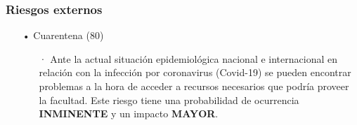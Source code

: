 \subsubsection{Riesgos externos}  
    
    \begin{itemize}
        \item[•] Cuarentena (80)
        \begin{itemize}
            \item[·] Ante la actual situación epidemiológica nacional e internacional en relación con la infección por coronavirus (Covid-19) se pueden encontrar problemas a la hora de acceder a recursos necesarios que podría proveer la facultad. Este riesgo tiene una probabilidad de ocurrencia \textbf{INMINENTE} y un impacto \textbf{MAYOR}.
        \end{itemize}
    \end{itemize}
    
    \newpage


